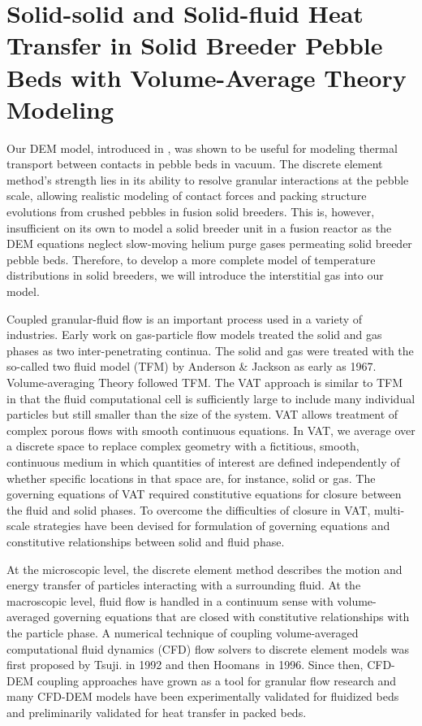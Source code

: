 \chapter{Solid-solid and Solid-fluid Heat Transfer in Solid Breeder Pebble Beds with Volume-Average Theory Modeling}\label{ch:cfd-dem-modeling-development}
Our DEM model, introduced in , was shown to be useful for modeling thermal transport between contacts in pebble beds in vacuum. The discrete element method's strength lies in its ability to resolve granular interactions at the pebble scale, allowing realistic modeling of contact forces and packing structure evolutions from crushed pebbles in fusion solid breeders. This is, however, insufficient on its own to model a solid breeder unit in a fusion reactor as the DEM equations neglect slow-moving helium purge gases permeating solid breeder pebble beds. Therefore, to develop a more complete model of temperature distributions in solid breeders, we will introduce the interstitial gas into our model.

Coupled granular-fluid flow is an important process used in a variety of industries.\cite{Zhou2010,Kloss2012} Early work on gas-particle flow models treated the solid and gas phases as two inter-penetrating continua. The solid and gas were treated with the so-called two fluid model (TFM) by Anderson \& Jackson as early as 1967.\cite{Anderson1967} Volume-averaging Theory followed TFM. The VAT approach is similar to TFM in that the fluid computational cell is sufficiently large to include many individual particles but still smaller than the size of the system.\cite{Enwald1996} VAT allows treatment of complex porous flows with smooth continuous equations. In VAT, we average over a discrete space to replace complex geometry with a fictitious, smooth, continuous medium in which quantities of interest are defined independently of whether specific locations in that space are, for instance, solid or gas.\cite{Sbutega2013,whitaker1999method,} The governing equations of VAT required constitutive equations for closure between the fluid and solid phases. To overcome the difficulties of closure in VAT, multi-scale strategies have been devised for formulation of governing equations and constitutive relationships between solid and fluid phase. 

At the microscopic level, the discrete element method describes the motion and energy transfer of particles interacting with a surrounding fluid. At the macroscopic level, fluid flow is handled in a continuum sense with volume-averaged governing equations that are closed with constitutive relationships with the particle phase.\cite{Tsuji1992,Xu1997} A numerical technique of coupling volume-averaged computational fluid dynamics (CFD) flow solvers to discrete element models was first proposed by Tsuji\etal. in 1992 and then Hoomans\etal~in 1996.\cite{Tsuji1992,Tsuji1993,Hoomans1996} Since then, CFD-DEM coupling approaches have grown as a tool for granular flow research and many CFD-DEM models have been experimentally validated for fluidized beds and preliminarily validated for heat transfer in packed beds.\cite{Kloss2012,Xu1997,Patankar2001,Swasdisevi2005,Deen2007,Zhang2008,Chu2008,VanBuijtenen2011,Gruber2012,Peng2014}


